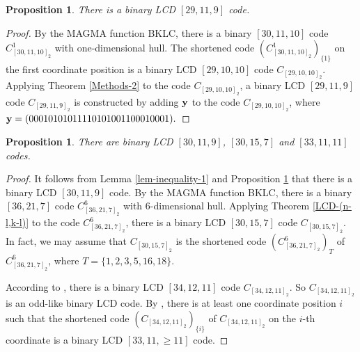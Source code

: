\documentclass[12pt,twoside]{article}
\theoremstyle{plain}
\newtheorem{prop}[theorem]{Proposition}
\theoremstyle{definition}
\theoremstyle{remark}
\begin{document}
\begin{prop}\label{29}
There is a binary LCD $[29,11,9]$ code.
\end{prop}
\begin{proof}
By the MAGMA function BKLC, there is a binary $[30,11,10]$ code $C^{1}_{[30,11,10]_2}$ with one-dimensional hull. The shortened code $(C^{1}_{[30,11,10]_2})_{\{1\}}$ on the first coordinate position is a binary LCD $[29,10,10]$ code $C_{[29,10,10]_2}$.
Applying Theorem \ref{Methods-2} to the code $C_{[29,10,10]_2}$, a binary LCD $[29,11,9]$ code $C_{[29,11,9]_2}$ is constructed by adding ${\bf y}$ to the code $C_{[29,10,10]_2}$, where
${\bf y}=(0 0 0 1 0 1 0 1 0 1 1 1 1 0 1 0 1 0 0 1 1 0 0 0 1 0 0 0 1).$
\end{proof}

\begin{prop}\label{[30,12,9]-[30,15,7]}
There are binary LCD $[30,11,9]$, $[30,15,7]$ and $[33,11,11]$ codes.
\end{prop}

\begin{proof}
It follows from Lemma \ref{lem-inequality-1} and Proposition \ref{29} that there is a binary LCD $[30,11,9]$ code.
By the MAGMA function BKLC, there is a binary $[36,21,7]$ code $C_{[36,21,7]_2}^6$ with 6-dimensional hull.
Applying Theorem \ref{LCD-(n-l,k-l)} to the code $C_{[36,21,7]_2}^6$, there is a binary LCD $[30,15,7]$ code $C_{[30,15,7]_2}$. In fact, we may assume that $C_{[30,15,7]_2}$ is the shortened code $(C_{[36,21,7]_2}^6)_T$ of $C_{[36,21,7]_2}^6$, where $T=\{1,2,3,5,16,18\}$.

According to \cite{2-LCD-40}, there is a binary LCD $[34,12,11]$ code $C_{[34,12,11]_2}$.
So $C_{[34,12,11]_2}$ is an odd-like binary LCD code. By \cite[Propsition 3]{2-LCD-40}, there is at least one coordinate position $i$ such that the shortened code $(C_{[34,12,11]_2})_{\{i\}}$ of $C_{[34,12,11]_2}$ on the $i$-th coordinate is a binary LCD $[33,11,\geq 11]$ code.
\end{proof}
\end{document}
